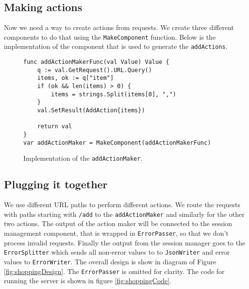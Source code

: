 \subsection{Making actions}
Now we need a way to create actions from requests. We create three different
components to do that using the \texttt{MakeComponent} function. Below
is the implementation of the component that is used to generate 
the \texttt{addActions}.
\begin{figure}[h]
\begin{lstlisting}
func addActionMakerFunc(val Value) Value {
    q := val.GetRequest().URL.Query()
    items, ok := q["item"]
    if (ok && len(items) > 0) {
        items = strings.Split(items[0], ",")
    }
    val.SetResult(AddAction{items})
    
    return val
}
var addActionMaker = MakeComponent(addActionMakerFunc) 
\end{lstlisting}
\caption[scale=1.0]{Implementation of the \texttt{addActionMaker}.}
\label{fig:addActionMaker}
\end{figure}

\subsection{Plugging it together}
We use different URL paths to perform different actions. We route the 
requests with paths starting with \texttt{/add} to the \texttt{addActionMaker}
and similarly for the other two actions. The output of the action maker
will be connected to the session management component, that is wrapped in
\texttt{ErrorPasser}, so that we don't process invalid requests.
Finally the output from the session manager goes to the \texttt{ErrorSplitter}
which sends all non-error values to to \texttt{JsonWriter} and error
values to \texttt{ErrorWriter}. The overall design is show in diagram 
of Figure \ref{fig:shoppingDesign}. The \texttt{ErrorPasser} is omitted 
for clarity. The code for running the server is shown in figure 
\ref{fig:shoppingCode}.

